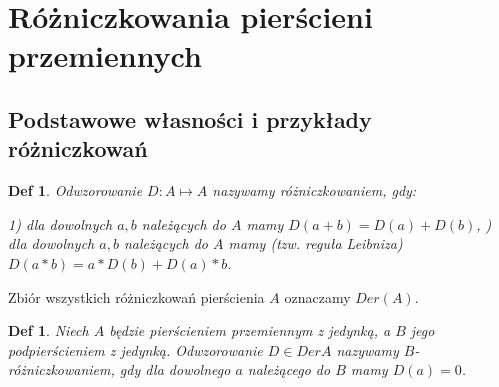 \documentclass[12pt,a4paper]{article}
\newtheorem{definition}[twr]{Def}
\numberwithin{equation}{section}
\begin{document}
\newpage
\section{Różniczkowania pierścieni przemiennych}
\subsection{Podstawowe własności i przykłady różniczkowań}

\begin{definition} \normalfont
Odwzorowanie $D: A \mapsto A$ nazywamy różniczkowaniem, gdy:
    \begin{flushleft}
1)\: dla dowolnych $a,b$ należących do $A$ mamy $D(a+b)=D(a)+D(b)$, )\: dla dowolnych $a,b$ należących do $A$ mamy (tzw. reguła Leibniza) $D(a*b)=a*D(b)+D(a)*b$.
    \end{flushleft}
\end{definition}

Zbiór wszystkich różniczkowań pierścienia $A$ oznaczamy $Der(A)$.

\begin{definition} \normalfont
Niech $A$ będzie pierścieniem przemiennym z jedynką, a $B$ jego podpierścieniem z jedynką. Odwzorowanie $D \in DerA$ nazywamy $B$-różniczkowaniem, gdy dla dowolnego $a$ należącego do $B$ mamy $D(a)=0$.
\end{definition}
\end{document}
